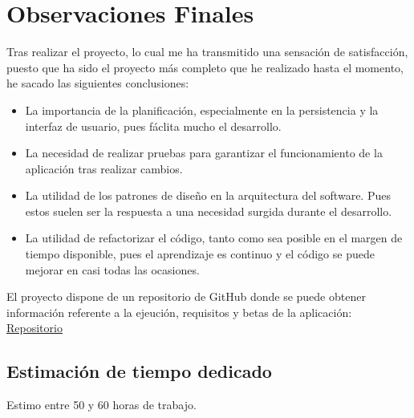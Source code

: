 \section*{Observaciones Finales}

Tras realizar el proyecto, lo cual me ha transmitido una sensación de satisfacción, puesto que ha sido el
proyecto más completo que he realizado hasta el momento, he sacado las siguientes conclusiones:
\begin{itemize}
    \item La importancia de la planificación, especialmente en la persistencia y la interfaz de usuario, pues fáclita mucho el desarrollo.
    \item La necesidad de realizar pruebas para garantizar el funcionamiento de la aplicación tras realizar cambios.
    \item La utilidad de los patrones de diseño en la arquitectura del software. Pues estos suelen ser la respuesta a una necesidad surgida durante el desarrollo.
    \item La utilidad de refactorizar el código, tanto como sea posible en el margen de tiempo disponible,  pues el aprendizaje es continuo y el código se puede mejorar en casi todas las ocasiones.
\end{itemize}

El proyecto dispone de un repositorio de GitHub donde se puede obtener información referente a la ejeución, requisitos y betas de la aplicación: 
\textcolor{blue}{\href{https://github.com/StoneySpring688/AppChat_2024-2025}{Repositorio}}


\subsection*{Estimación de tiempo dedicado}

Estimo entre 50 y 60 horas de trabajo.
